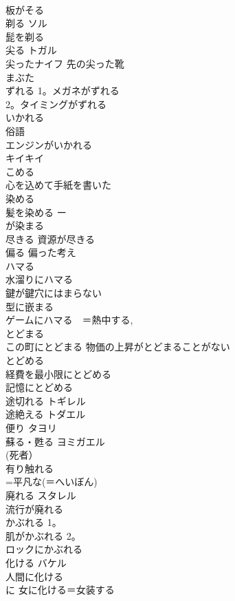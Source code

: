 \documentclass[8pt]{extreport}
\begin{document}
\begin{CJK}{UTF8}{min}
\\	板がそる
\\	剃る	ソル 
\\	髭を剃る 
\\	尖る	トガル 
\\	尖ったナイフ 先の尖った靴　
\\	まぶた	
\\	ずれる	1。メガネがずれる 
\\	2。タイミングがずれる 
\\	いかれる　　
\\	俗語
\\	エンジンがいかれる
\\	キイキイ	
\\	こめる	
\\	心を込めて手紙を書いた
\\	染める	
\\	髪を染める ー
\\	が染まる 
\\	尽きる	資源が尽きる 
\\	偏る	偏った考え 
\\	ハマる	
\\	水溜りにハマる　
\\	鍵が鍵穴にはまらない 
\\	型に嵌まる　
\\	ゲームにハマる　＝熱中する, 
\\	とどまる	
\\	この町にとどまる 物価の上昇がとどまることがない
\\	とどめる	
\\	経費を最小限にとどめる 
\\	記憶にとどめる 
\\	途切れる	トギレル 
\\	途絶える	トダエル 
\\	便り	タヨリ 
\\	蘇る・甦る	ヨミガエル 
\\	(死者） 
\\	有り触れる	
\\	=平凡な(＝へいぼん)
\\	廃れる	スタレル 
\\	流行が廃れる
\\	かぶれる	1。
\\	肌がかぶれる 2。
\\	ロックにかぶれる
\\	化ける	バケル 
\\	人間に化ける 
\\	に 女に化ける＝女装する

\end{CJK}
\end{document}
